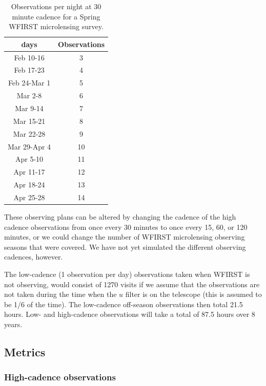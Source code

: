 \begin{table}
\begin{tabular}{ c c }
{\bf days} & {\bf Observations} \\
\hline
Feb 10-16     &  3 \\
Feb 17-23     &  4 \\
Feb 24-Mar 1  &  5 \\
Mar 2-8       &  6 \\
Mar 9-14      &  7 \\
Mar 15-21     &  8 \\
Mar 22-28     &  9 \\
Mar 29-Apr 4  & 10 \\
Apr 5-10      & 11 \\
Apr 11-17     & 12 \\
Apr 18-24     & 13 \\
Apr 25-28     & 14 \\
\end{tabular}
\caption{Observations per night at 30 minute cadence for a Spring
WFIRST microlensing survey.}
\label{tab:wfirst_ml_survey}
\end{table}

These observing plans can be altered by changing the cadence of the high
cadence observations from once every 30 minutes to once every 15, 60,
or 120 minutes, or we could change the number of WFIRST microlensing
observing seasons that were covered. We have not yet simulated the
different observing cadences, however.

The low-cadence (1 observation per day) observations taken when WFIRST
is not observing, would consist of 1270 visits if we assume that
the observations are not taken during the time when the $u$ filter is
on the telescope (this is assumed to be 1/6 of the time). The low-cadence
off-season observations then total 21.5 hours. Low- and high-cadence 
observations will take a total of 87.5 hours over 8 years.




\subsection{Metrics}
\label{sec:\secname:metrics}

\subsubsection{High-cadence observations}

